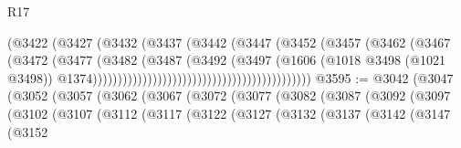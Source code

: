 \begin{lexlean}{R17}
\begin{coremodule}
{{{{{{{{{{{{{{{{{{{{{{{{{{{{{{{{{{{{{{{{{{{{{{{{{{{{{{{{{{{{{{{{{{{{{{{{{{{{{{{{{{{{{{{{{{{{{{{{{{{{{{{{{{{                                                          (@3422
                                                            (@3427
                                                              (@3432
                                                                (@3437
                                                                  (@3442
                                                                    (@3447
                                                                      (@3452
                                                                        (@3457
                                                                          (@3462
                                                                            (@3467
                                                                              (@3472
                                                                                (@3477
                                                                                  (@3482
                                                                                    (@3487
                                                                                      (@3492
                                                                                        (@3497
                                                                                          (@1606
                                                                                            (@1018
                                                                                              @3498
                                                                                              (@1021
                                                                                                @3498))
                                                                                            @1374))))))))))))))))))))))))))))))))))))))))))))
@3595 := @3042
    (@3047
      (@3052
        (@3057
          (@3062
            (@3067
              (@3072
                (@3077
                  (@3082
                    (@3087
                      (@3092
                        (@3097
                          (@3102
                            (@3107
                              (@3112
                                (@3117
                                  (@3122
                                    (@3127
                                      (@3132
                                        (@3137
                                          (@3142
                                            (@3147
                                              (@3152
}}}}}}}}}}}}}}}}}}}}}}}}}}}}}}}}}}}}}}}}}}}}}}}}}}}}}}}}}}}}}}}}}}}}}}}}}}}}}}}}}}}}}}}}}}}}}}}}}}}}}}}}}}}
\end{coremodule}
\end{lexlean}
